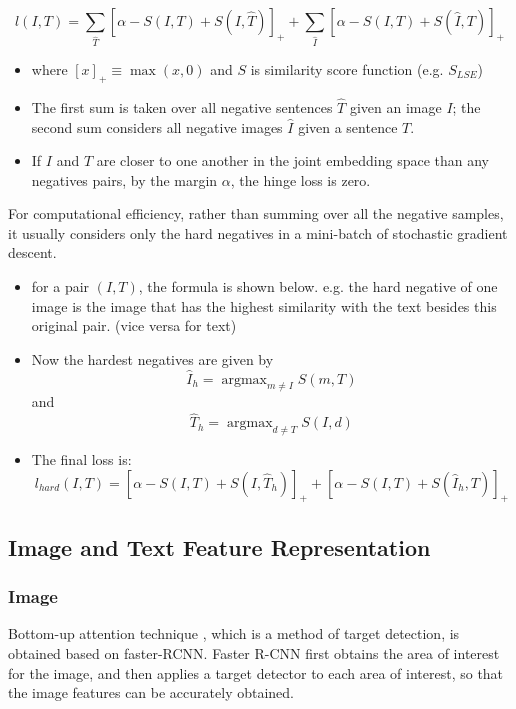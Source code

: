 $$
l(I, T)=\sum_{\hat{T}}[\alpha-S(I, T)+S(I, \hat{T})]_{+}+\sum_{\hat{I}}[\alpha-S(I, T)+S(\hat{I}, T)]_{+}
$$

\begin{itemize}
    \item where $[x]_{+} \equiv \max (x, 0)$ and $S$ is similarity score function (e.g. $S_{L S E}$)
    \item The first sum is taken over all negative sentences $\hat{T}$ given an image $I$; the second sum considers all negative images $\hat{I}$ given a sentence $T$.
    \item If $I$ and $T$ are closer to one another in the joint embedding space than any negatives pairs, by the margin $\alpha$, the hinge loss is zero.
\end{itemize}

For computational efficiency, rather than summing over all the negative samples, it usually considers only the hard negatives in a mini-batch of stochastic gradient descent.

\begin{itemize}
    \item for a pair $(I, T)$, the formula is shown below. e.g. the hard negative of one image is the image that has the highest similarity with the text besides this original pair. (vice versa for text)
    \item Now the hardest negatives are given by $$\hat{I}_{h}=\operatorname{argmax}_{m \neq I} S(m, T)$$ and $$\hat{T}_{h}=\operatorname{argmax}_{d \neq T} S(I, d)$$
    \item The final loss is: 
    $$l_{h a r d}(I, T)=\left[\alpha-S(I, T)+S\left(I, \hat{T}_{h}\right)\right]_{+}+\left[\alpha-S(I, T)+S\left(\hat{I}_{h}, T\right)\right]_{+}$$
\end{itemize}

\subsection{Image and Text Feature Representation}

\subsubsection{Image}Bottom-up attention technique \cite{bottomup}, which is a method of target detection, is obtained based on faster-RCNN. Faster R-CNN first obtains the area of interest for the image, and then applies a target detector to each area of interest, so that the image features can be accurately obtained.

